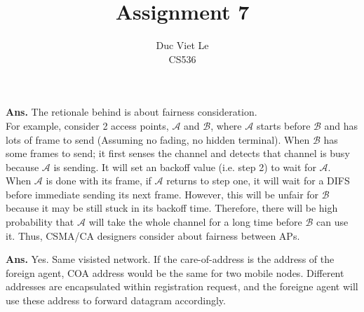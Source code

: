 \documentclass[11pt]{article}
\newenvironment{problem}[2][Problem]{\begin{trivlist}
\item[\hskip \labelsep {\bfseries #1}\hskip \labelsep {\bfseries #2.}]}{\end{trivlist}}
\begin{document}
\title{Assignment 7}
\author{Duc Viet Le\\ CS536}
\maketitle
\begin{problem}{1}
\end{problem}
\textbf{Ans. } The retionale behind is about fairness consideration. \\ 
For example, consider 2 access points, $\mathcal{A}$ and $\mathcal{B}$, where $\mathcal{A}$ starts before $\mathcal{B}$ and has lots of frame to send (Assuming no fading, no hidden terminal).  
When $\mathcal{B}$ has some frames to send; it first senses the channel and detects that channel is busy because $\mathcal{A}$ is sending. It will set an backoff value (i.e. step 2) to wait for $\mathcal{A}$. When $\mathcal{A}$ is done with its frame, if $\mathcal{A}$ returns to step one, it will wait for a DIFS before immediate sending its next frame. However, this will be unfair for $\mathcal{B}$ because it may be still stuck in its backoff time. Therefore, there will be high probability that $\mathcal{A}$ will take the whole channel for a long time before $\mathcal{B}$ can use it. Thus, CSMA/CA designers consider about fairness between APs.
\begin{problem}{2}
\end{problem}
\textbf{Ans. } Yes. Same visisted network. If the care-of-address is the address of the foreign agent, COA address would be the same for two mobile nodes. Different addresses are encapsulated within registration request, and the foreigne agent will use these address to forward datagram accordingly.
\end{document}
